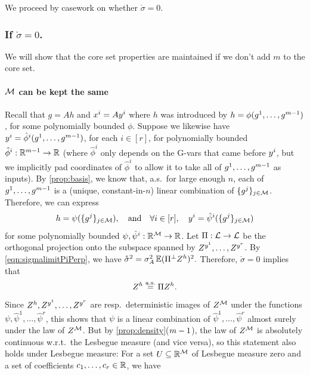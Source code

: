 \documentclass[main.tex]{subfiles}
\begin{document}
We proceed by casework on whether $\mathring \sigma = 0$.

\newcommand{\Lsq}{\mathcal{L}}
\subsubsection{If \texorpdfstring{$\mathring \sigma = 0$}{sigma converges to 0 a.s.}.}

We will show that the core set properties are maintained if we don't add $m$ to the core set.

\paragraph{$\mathcal{M}$ can be kept the same}
Recall that $g = Ah$ and $x^i = A y^i$ where $h$ was introduced by $h = \phi(g^{1}, \ldots, g^{m - 1})$, for some polynomially bounded $\phi$.
Suppose we likewise have $y^i = \hat \phi^i(g^1, \ldots, g^{m-1})$, for each $i \in [r]$, for polynomially bounded $\hat \phi^i: \mathbb{R}^{m-1} \to \mathbb{R}$ (where $\hat\phi^i$ only depends on the G-vars that came before $y^i$, but we implicitly pad coordinates of $\hat \phi^i$ to allow it to take all of $g^1, \ldots, g^{m-1}$ as inputs).
By \ref{prop:basis}, we know that, a.s.\ for large enough $n$, each of $g^1, \ldots, g^{m-1}$ is a (unique, constant-in-$n$) linear combination of $\{g^j\}_{j \in \mathcal{M}}$.
Therefore, we can express
\begin{equation}h = \psi(\{g^j\}_{j \in \coreset}),\quad\text{and}\quad
\forall i \in [r],\quad \yme^i = \hat {\psi}^i(\{g^j\}_{j \in \coreset})
\label{eqn:psireduce}
\end{equation}
for some polynomially bounded $\psi, \hat {\psi}^i: \mathbb{R}^{\mathcal{M}} \to \mathbb{R}$.
Let $\Pi: \mathcal{L} \to \mathcal{L}$ be the orthogonal projection onto the subspace spanned by $Z^{y^1}, \ldots, Z^{y^r}$.
By \cref{eqn:sigmalimitPiPerp}, we have
\(
\mathring\sigma^2
    =
        \sigma_A^2 \operatorname*{\mathbb{E}} (\Pi^\perp Z^h)^2
        .
\)
Therefore, $\mathring \sigma = 0$ implies that 
\[Z^h \overset{\mathrm{a.s.}}{=} \Pi Z^h.\]
Since $Z^h, Z^{y^1}, \ldots, Z^{y^r}$ are resp.\ deterministic images of $Z^{\mathcal{M}}$ under the functions $\psi, \hat \psi^1, \ldots, \hat \psi^r$, this shows that $\psi$ is a linear combination of $\hat \psi^1, \ldots, \hat \psi^r$ almost surely under the law of $Z^{\mathcal{M}}$.
But by \ref{prop:density}($m-1$), the law of $Z^{\mathcal{M}}$ is absolutely continuous w.r.t.\ the Lesbegue measure (and vice versa), so this statement also holds under Lesbegue measure:
For a set $U \subseteq \mathbb{R}^{\mathcal{M}}$ of Lesbegue measure zero and a set of coefficients $c_1, \ldots, c_r \in \mathbb{R}$, we have
\end{document}
